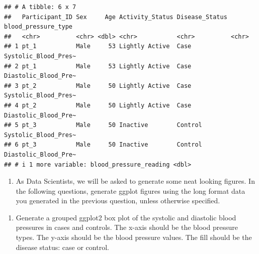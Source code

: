 \documentclass[
]{article}
\providecommand{\tightlist}{%
  \setlength{\itemsep}{0pt}\setlength{\parskip}{0pt}}
\begin{document}
\begin{verbatim}
## # A tibble: 6 x 7
##   Participant_ID Sex     Age Activity_Status Disease_Status blood_pressure_type 
##   <chr>          <chr> <dbl> <chr>           <chr>          <chr>               
## 1 pt_1           Male     53 Lightly Active  Case           Systolic_Blood_Pres~
## 2 pt_1           Male     53 Lightly Active  Case           Diastolic_Blood_Pre~
## 3 pt_2           Male     50 Lightly Active  Case           Systolic_Blood_Pres~
## 4 pt_2           Male     50 Lightly Active  Case           Diastolic_Blood_Pre~
## 5 pt_3           Male     50 Inactive        Control        Systolic_Blood_Pres~
## 6 pt_3           Male     50 Inactive        Control        Diastolic_Blood_Pre~
## # i 1 more variable: blood_pressure_reading <dbl>
\end{verbatim}

\begin{enumerate}
\def\labelenumi{\arabic{enumi})}
\setcounter{enumi}{2}
\tightlist
\item
  As Data Scientists, we will be asked to generate some neat looking
  figures. In the following questions, generate ggplot figures using the
  long format data you generated in the previous question, unless
  otherwise specified.
\end{enumerate}

\begin{enumerate}
\def\labelenumi{\alph{enumi})}
\tightlist
\item
  Generate a grouped ggplot2 box plot of the systolic and diastolic
  blood pressures in cases and controls. The x-axis should be the blood
  pressure types. The y-axis should be the blood pressure values. The
  fill should be the disease status: case or control.
\end{enumerate}
\end{document}
